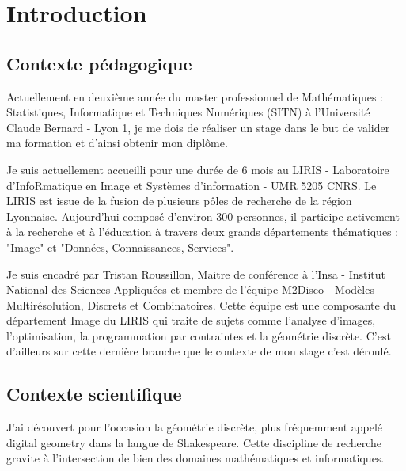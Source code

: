 \section{Introduction}

\subsection{Contexte pédagogique}

Actuellement en deuxième année du master professionnel de Mathématiques : Statistiques, Informatique et Techniques Numériques (SITN) à l’Université Claude Bernard - Lyon 1, je me dois de réaliser un stage dans le but de valider ma formation et d'ainsi obtenir mon diplôme. \newline

Je suis actuellement accueilli pour une durée de 6 mois au LIRIS - Laboratoire d'InfoRmatique en Image et Systèmes d'information - UMR 5205 CNRS. Le LIRIS est issue de la fusion de plusieurs pôles de recherche de la région Lyonnaise. Aujourd'hui composé d'environ 300 personnes, il participe activement à la recherche et à l'éducation à travers deux grands départements thématiques : "Image" et "Données, Connaissances, Services".\newline

Je suis encadré par Tristan Roussillon, Maitre de conférence à l'Insa - Institut National des Sciences Appliquées et membre de l'équipe M2Disco - Modèles Multirésolution, Discrets et Combinatoires. Cette équipe est une composante du département Image du LIRIS qui traite de sujets comme l'analyse d'images, l'optimisation, la programmation par contraintes et la géométrie discrète. C'est d'ailleurs sur cette dernière branche que le contexte de mon stage c'est déroulé.



\subsection{Contexte scientifique}

J'ai découvert pour l’occasion la géométrie discrète, plus fréquemment appelé digital geometry dans la langue de Shakespeare. Cette discipline de recherche gravite à l'intersection de bien des domaines mathématiques et informatiques.\\

